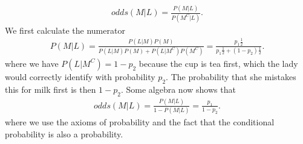 \begin{exercise}[BH.3.31]
\begin{solution}
\begin{enumerate}
\begin{align*}
            odds(M|L) = \frac{P(M|L)}{P(M^{C}|L)}.
        \end{align*}
        We first calculate the numerator
        \begin{align*}
            P(M|L) = \frac{P(L|M)P(M)}{P(L|M)P(M) + P(L|M^{C})P(M^{C})} = \frac{p_{1}\frac{1}{2}}{p_1\frac{1}{2} + (1-p_{2})\frac{1}{2}}.
        \end{align*}
        where we have $ P(L|M^{C})=1-p_{2}$ because the cup is tea first, which the lady would correctly identify with probability $p_{2}$. The probability that she mistakes this for milk first is then $1-p_{2}$. Some algebra now shows that
                        \begin{align*}
        odds(M|L) = \frac{P(M|L)}{1-P(M|L)} =\frac{p_{1}}{1-p_{2}}.
        \end{align*}
        where we use the axioms of probability and the fact that the conditional probability is also a probability.
    \end{enumerate}
\end{solution}
\end{exercise}


